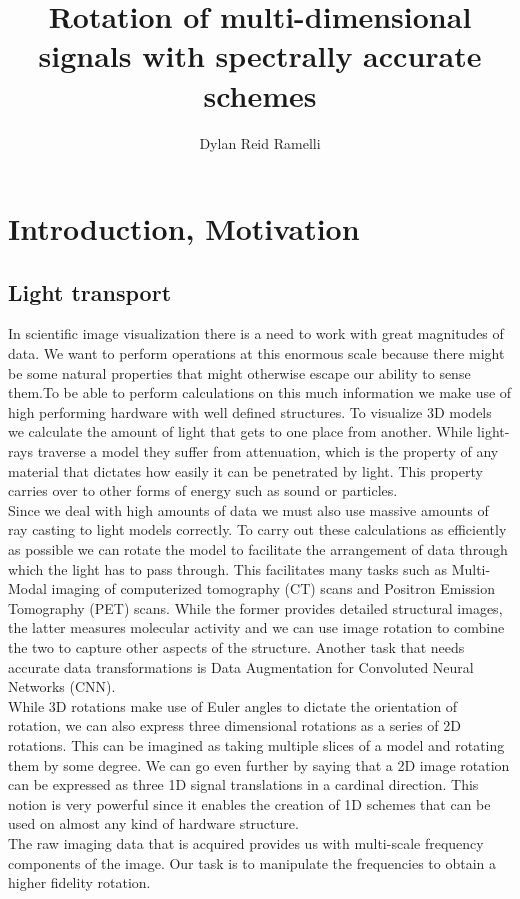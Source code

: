 \documentclass[]{usiinfbachelorproject}
\title{Rotation of multi-dimensional signals with spectrally accurate schemes}
\author{Dylan Reid Ramelli}
\begin{document}
	
	
	\maketitle
		
		
	\tableofcontents
	\newpage
	\section{Introduction, Motivation}\label{introduction}
	
	\subsection{Light transport}
	In scientific image visualization there is a need to work with great magnitudes of data. We want to perform operations at this enormous scale because there might be some natural properties that might otherwise escape our ability to sense them.To be able to perform calculations on this much information we make use of high performing hardware with well defined structures.
	To visualize 3D models we calculate the amount of light that gets to one place from another. While light-rays traverse a model they suffer from attenuation, which is the property of any material that dictates how easily it can be penetrated by light. This property carries over to other forms of energy such as sound or particles.\\
	Since we deal with high amounts of data we must also use massive amounts of ray casting to light models correctly. 
	To carry out these calculations as efficiently as possible we can rotate the model to facilitate the arrangement of data through which the light has to pass through. This facilitates many tasks such as Multi-Modal imaging of computerized tomography (CT) scans and Positron Emission Tomography (PET) scans. While the former provides detailed structural images, the latter measures molecular activity and we can use image rotation to combine the two to capture other aspects of the structure. Another task that needs accurate data transformations is Data Augmentation for Convoluted Neural Networks (CNN).\\
	While 3D rotations make use of Euler angles to dictate the orientation of rotation, we can also express three dimensional rotations as a series of 2D rotations. This can be imagined as taking multiple slices of a model and rotating them by some degree. We can go even further by saying that a 2D image rotation can be expressed as three 1D signal translations in a cardinal direction\cite{main_article}. This notion is very powerful since it enables the creation of 1D schemes that can be used on almost any kind of hardware structure.\\
	The raw imaging data that is acquired provides us with multi-scale frequency components of the image. Our task is to manipulate the frequencies to obtain a higher fidelity rotation.
	
\end{document}
